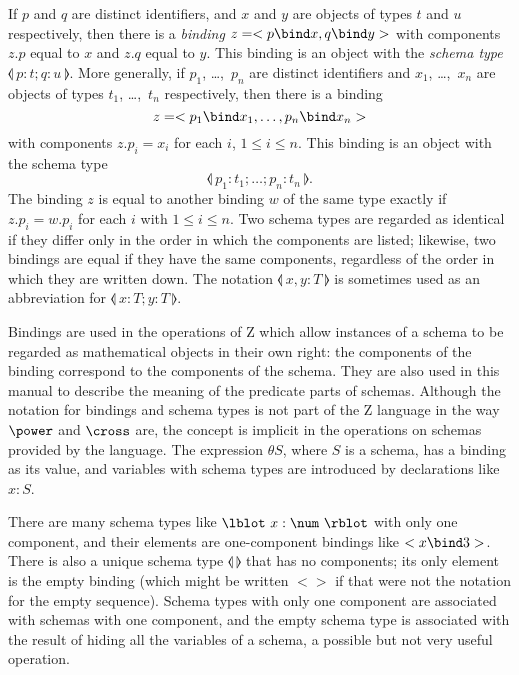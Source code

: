 \new If $p$ and $q$ are distinct identifiers, and
$x$ and $y$ are objects of types $t$ and $u$ respectively, then
there is a {\em binding\/}%
$z = <p \bind x, q \bind y>$ with components $z.p$ equal to $x$ and $z.q$ equal to $y$. This binding
is an object with the {\em schema type\/}%
	\symdex{$\lblot\ldots\rblot$}%
$\lblot~p: t; q: u~\rblot$. More generally, if $p_1$, \dots,~$p_n$
are distinct identifiers and $x_1$, \dots,~$x_n$ are objects of
types $t_1$, \dots,~$t_n$ respectively, then there is a binding
\[ z = <p_1 \bind x_1, \ldots, p_n \bind x_n> \]
with components $z.p_i = x_i$ for each $i$, $1 \leq i \leq n$. This
binding is an object with the schema type
\[ \lblot~p_1: t_1; \ldots; p_n: t_n~\rblot. \]
The binding $z$ is equal to another binding $w$ of the same type
exactly if $z.p_i = w.p_i$ for each $i$ with $1 \leq i \leq n$.  Two
schema types are regarded as identical if they differ only in the
order in which the components are listed; likewise, two bindings are
equal if they have the same components, regardless of the order in
which they are written down.  The notation $\lblot~x, y: T~\rblot$ is
sometimes used as an abbreviation for $\lblot~x: T; y: T~\rblot$.

\new Bindings are used in the operations of Z which allow instances
of a schema to be regarded as mathematical objects in their own
right: the components of the binding correspond to the components of
the schema.  They are also used in this manual to describe the
meaning of the predicate parts of schemas.  Although the notation
for bindings and schema types is not part of the Z language in the
way $\power$ and $\cross$ are, the concept is implicit in the
operations on schemas provided by the language. The expression
$\theta S$, where $S$ is a schema, has a binding as its value, and
variables with schema types are introduced by declarations like $x:
S$.

\new There are many schema types like $\lblot~x: \num~\rblot$ with
only one component, and their elements are one-component bindings
like $<x \bind 3>$.  There is also a unique schema type
$\lblot~\rblot$ that has no components; its only element is the 
empty binding (which might be written $<>$ if that were not the
notation for the empty sequence).  Schema types with only one
component are associated with schemas with one component, and the
empty schema type is associated with the result of hiding all the
variables of a schema, a possible but not very useful operation.%

